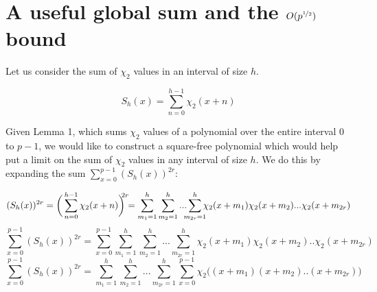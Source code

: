 \documentclass{report}
\begin{document}
\section{A useful global sum and the $O(p^{\nicefrac{1}{2}})$ bound}
Let us consider the sum of $\chi_2$ values in an interval of size $h$.

$$S_h(x)=\sum\limits_{n=0}^{h-1}\chi_2(x+n)$$

Given Lemma 1, which sums $\chi_2$ values of a polynomial over the entire interval $0$ to $p-1$, we would like to construct a square-free polynomial which would help put a limit on the sum of $\chi_2$ values in any interval of size $h$. We do this by expanding the sum $\sum\limits_{x=0}^{p-1}(S_h(x))^{2r}$:

$$(S_h(x))^{2r}= \bigg(\sum\limits_{n=0}^{h-1}\chi_2(x+n)\bigg)^{\mathclap{2r}} =\sum\limits_{m_1=1}^h\sum\limits_{m_2=1}^h...\sum\limits_{\mathclap{m_{2r}=1}}^h\chi_2(x+m_1)\chi_2(x+m_2)...\chi_2(x+m_{2r})$$
$$\sum\limits_{x=0}^{p-1}(S_h(x))^{2r}=\sum\limits_{x=0}^{p-1}\sum\limits_{m_1=1}^h\sum\limits_{m_2=1}^h...\sum\limits_{m_{2r}=1}^h\chi_2(x+m_1)\chi_2(x+m_2)..\chi_2(x+m_{2r})$$
\begin{equation} \label{sumpoly}
\sum\limits_{x=0}^{p-1}(S_h(x))^{2r}=\sum\limits_{m_1=1}^h\sum\limits_{m_2=1}^h...\sum\limits_{m_{2r}=1}^h\sum\limits_{x=0}^{p-1}\chi_2\big((x+m_1)(x+m_2)..(x+m_{2r})\big)
\end{equation}
\end{document}
